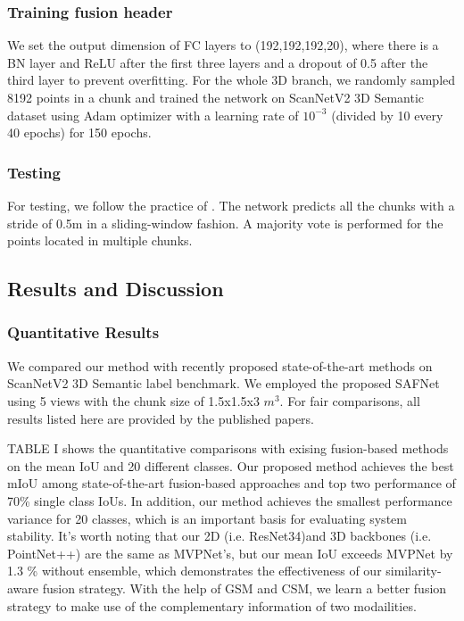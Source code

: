 \documentclass[letterpaper, 10 pt, conference]{ieeeconf}
\begin{document}
\subsubsection{\textbf{Training fusion header}}
We set the output dimension of FC layers to (192,192,192,20), where there is a BN layer and ReLU after the first three layers and a dropout of 0.5 after the third layer to prevent overfitting.
For the whole 3D branch, we randomly sampled 8192 points in a chunk and trained the network on ScanNetV2 3D Semantic dataset using Adam optimizer with a learning rate of $10^{-3}$ (divided by 10 every 40 epochs) for 150 epochs.

\subsubsection{\textbf{Testing}}
For testing, we follow the practice of  \cite{qi2017pointnet++,jaritz2019multi}. The network predicts all the chunks with a stride of 0.5m in a sliding-window fashion. A majority vote is performed for the points located in multiple chunks.


\subsection{Results and Discussion}
\subsubsection{\textbf{Quantitative Results}}

We compared our method with recently proposed state-of-the-art methods on ScanNetV2 3D Semantic label benchmark. We employed the proposed SAFNet using 5 views with the chunk size of 1.5x1.5x3 $m^{3}$. For fair comparisons, all results listed here are provided by the published papers.

TABLE I shows the quantitative comparisons 
with exising fusion-based methods on the mean IoU and 20 different classes. Our proposed method achieves the best mIoU among state-of-the-art fusion-based approaches and top two performance of 70\% single class IoUs. In addition, our method achieves the smallest performance variance for 20 classes, which is an important basis for evaluating system stability. It’s worth noting that our 2D (i.e. ResNet34)and 3D  backbones (i.e. PointNet++) are the same as MVPNet's, but 
our mean IoU exceeds MVPNet by 1.3 \% without ensemble, which demonstrates the effectiveness of our similarity-aware fusion strategy. 
With the help of GSM and CSM, we learn a better fusion strategy to make use of the complementary information of two modailities.
\end{document}
